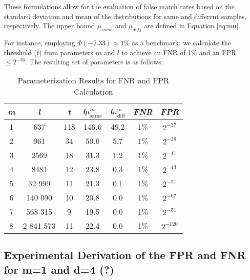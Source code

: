 These formulations allow for the evaluation of false match rates based on the standard deviation and mean of the distributions for same and different samples, respectively. The upper bound \(\mu_{same}\) and \(\mu_{diff}\) are defined in Equation \ref{eq:mu}.

For instance, employing \(\Phi(-2.33) \approx 1\%\) as a benchmark, we calculate the threshold (\(t\)) from parameters \(m\) and \(l\) to achieve an FNR of 1\% and an FPR \(\leq 2^{-36} \). The resulting set of parameters is as follows: 

\begin{table}[htbp] 
    \centering
    \begin{tabular}{|c|c|c|c|c|c|c|}
        \hline
        \textit{m} & \textit{l} & \textit{t} & \textit{l}\(\mu_{\text{same}}^m\) & \textit{l}\(\mu_{\text{diff}}^m\) & \textit{FNR} & \textit{FPR} \\
        \hline
        1 & 637 & 118 & 146.6 & 49.2 & 1\% & \(2^{-37}\) \\
        2 & 961 & 34 & 50.0 & 5.7 & 1\% & \(2^{-38}\) \\
        3 & 2569 & 18 & 31.3 & 1.2 & 1\% & \(2^{-41}\) \\
        4 & 8481 & 12 & 23.8 & 0.3 & 1\% & \(2^{-43}\) \\
        5 & 32 999 & 11 & 21.3 & 0.1 & 1\% & \(2^{-51}\) \\
        6 & 140 090 & 10 & 20.8 & 0.0 & 1\% & \(2^{-67}\) \\
        7 & 568 315 & 9 & 19.5 & 0.0 & 1\% & \(2^{-51}\) \\
        8 & 2 841 573 & 11 & 22.4 & 0.0 & 1\% & \(2^{-120}\) \\
        \hline
    \end{tabular}
    \caption{Parameterization Results for FNR and FPR Calculation}
    \label{tab:parameterization}
\end{table}


\subsection{Experimental Derivation of the FPR and FNR for m=1 and d=4 (?)}